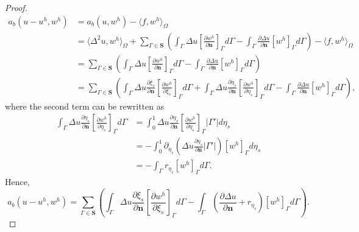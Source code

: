 \begin{theorem}
\begin{proof}
    \begin{equation}
      \begin{split}
        a_b(u-u^h,w^h)&=a_b(u, w^h)-\langle f,w^h \rangle_{\Omega}\\
        &=\langle \Delta^2u,w^h \rangle_{\Omega}+\sum_{\Gamma\in \mathbf{S}}\left(\int_\Gamma\Delta u\left[\frac{\partial{w^h}}{\partial \mathbf{n}}\right]_\Gamma d\Gamma - \int_\Gamma\frac{\partial \Delta u}{\partial \mathbf{n}}\left[{w^h}\right]_\Gamma d\Gamma\right)-\langle f,w^h \rangle_{\Omega}\\
        &=\sum_{\Gamma\in \mathbf{S}}\left(\int_\Gamma\Delta u\left[\frac{\partial{w^h}}{\partial \mathbf{n}}\right]_\Gamma d\Gamma - \int_\Gamma\frac{\partial \Delta u}{\partial \mathbf{n}}\left[{w^h}\right]_\Gamma d\Gamma\right)\\
        &=\sum_{\Gamma\in \mathbf{S}}\left(\int_\Gamma\Delta u \frac{\partial \xi_s}{\partial \mathbf{n}}\left[\frac{\partial{w^h}}{\partial \xi_s}\right]_\Gamma d\Gamma+\int_\Gamma\Delta u \frac{\partial \eta_s}{\partial \mathbf{n}}\left[\frac{\partial{w^h}}{\partial \eta_s}\right]_\Gamma d\Gamma-\int_\Gamma\frac{\partial \Delta u}{\partial \mathbf{n}}\left[{w^h}\right]_\Gamma d\Gamma\right),
      \end{split}
    \end{equation}
    where the second term can be rewritten as
    \begin{equation}
      \begin{split}
        \int_\Gamma\Delta u \frac{\partial \eta_s}{\partial \mathbf{n}}\left[\frac{\partial{w^h}}{\partial \eta_s}\right]_\Gamma d\Gamma &= \int_0^1\Delta u \frac{\partial \eta_s}{\partial \mathbf{n}}\left[\frac{\partial{w^h}}{\partial \eta_s}\right]_\Gamma \vert \Gamma' \vert d\eta_s\\
        &=-\int_0^1\partial_{\eta_s}\left(\Delta u \frac{\partial \eta_s}{\partial \mathbf{n}}\vert \Gamma' \vert\right)\left[{w^h}\right]_\Gamma d\eta_s\\
        &=-\int_\Gamma r_{\eta_s}\left[{w^h}\right]_\Gamma d\Gamma.
      \end{split}
    \end{equation}
    Hence,
    \begin{equation}
      a_b(u-u^h,w^h)=\sum_{\Gamma\in \mathbf{S}}\left(\int_\Gamma\Delta u \frac{\partial \xi_s}{\partial \mathbf{n}}\left[\frac{\partial{w^h}}{\partial \xi_s}\right]_\Gamma d\Gamma-\int_\Gamma\left(\frac{\partial \Delta u}{\partial \mathbf{n}} + r_{\eta_s}\right)\left[{w^h}\right]_\Gamma d\Gamma\right).

\end{equation}
\end{proof}
\end{theorem}
